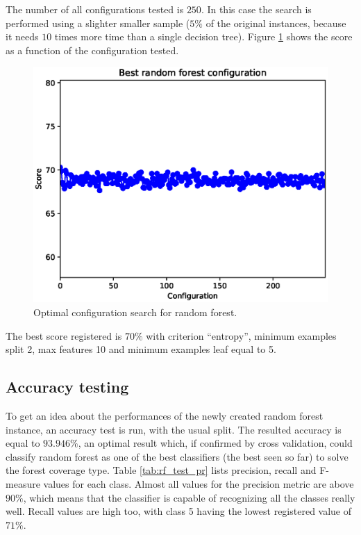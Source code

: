 \documentclass[a4paper, 10pt]{article}
\begin{document}
The number of all configurations tested is $250$. In this case the search is performed using a slighter smaller sample ($5\%$ of the original instances, because it needs $10$ times more time than a single decision tree). Figure \ref{fig:rf_config} shows the score as a function of the configuration tested.

\begin{figure}[H]
 \centering
 \includegraphics[width=0.8\linewidth]{pictures/random_forest_config.eps}
 \caption{Optimal configuration search for random forest.}
 \label{fig:rf_config}
\end{figure}

The best score registered is $70\%$ with criterion ``entropy'', minimum examples split 2, max features 10 and minimum examples leaf equal to 5.

\subsection{Accuracy testing}

To get an idea about the performances of the newly created random forest instance, an accuracy test is run, with the usual split. The resulted accuracy is equal to $93.946\%$, an optimal result which, if confirmed by cross validation, could classify random forest as one of the best classifiers (the best seen so far) to solve the forest coverage type. Table \ref{tab:rf_test_pr} lists precision, recall and F-measure values for each class. Almost all values for the precision metric are above $90\%$, which means that the classifier is capable of recognizing all the classes really well. Recall values are high too, with class 5 having the lowest registered value of $71\%$.
\end{document}
